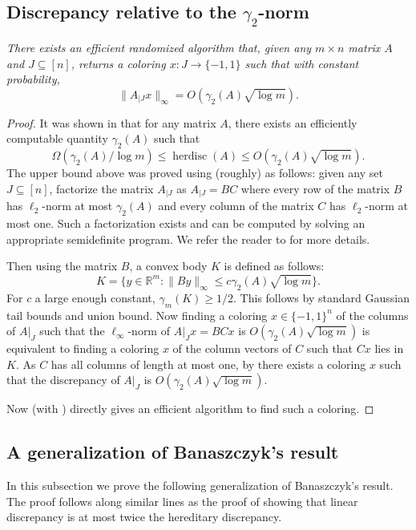 \documentclass{toc}
\DeclareMathOperator{\herdisc}{herdisc}   %
\begin{document}
\subsection{Discrepancy relative to the \texorpdfstring{$\gamma_2$}{gamma2}-norm}
 \emph{There exists an efficient randomized algorithm that, given any $m\times n$ matrix $A$ and $J\subseteq[n]$, returns a coloring $x:J\rightarrow\{-1,1\}$ such that with constant probability,
\[ \| A_{|J} x\|_{\infty} = O(\gamma_2(A)\sqrt{\log m}).\] }
\begin{proof}
It was shown in \cite{MNT14} that for any matrix $A$, there exists an efficiently computable quantity $\gamma_2(A)$ such that
\[ \Omega(\gamma_2(A)/\log m)\le \herdisc(A) \le O(\gamma_2(A)\sqrt{\log m}).\]
The upper bound above was proved using  (roughly) as follows: given any set $J\subseteq [n]$, factorize the matrix $A_{|J}$ as $A_{|J}=BC$
where every row of the matrix
%
$B$ has $\ell_2$-norm at most $\gamma_2(A)$ and every column of 
the matrix 
%
$C$ has $\ell_2$-norm at most one. Such a factorization exists and can be computed by solving an appropriate semidefinite program. We refer the reader to \cite{MNT14} for more details.

Then using the matrix $B$, a convex body $K$ is defined as follows:
\[ K=\{ y\in\mathbb{R}^m: \| By\|_{\infty} \le c\gamma_2(A)\sqrt{\log m} \}. \]
For $c$ a large enough constant, $\gamma_m(K)\ge 1/2$. This follows by standard Gaussian tail bounds and union bound. Now finding a coloring $x\in\{-1,1\}^n$ of the columns of $A|_J$ such that the $\ell_\infty$-norm of $A|_J x=BCx$ is $O(\gamma_2(A)\sqrt{\log m})$ is equivalent to finding a coloring $x$ of the column vectors of $C$ such that $Cx$ lies in $K$. As $C$ has all columns of length at most one, by  there exists a coloring $x$ such that the  discrepancy of $A|_J$ is $O(\gamma_2(A)\sqrt{\log m})$.

Now  (with ) directly gives an efficient algorithm to find such a coloring.
\end{proof}


\subsection{A generalization of Banaszczyk's result}


In this subsection we prove the following generalization of Banaszczyk's result. The proof follows along similar lines as the proof of \cite{LSV} showing that linear discrepancy is at most twice the hereditary discrepancy.\\
\end{document}
